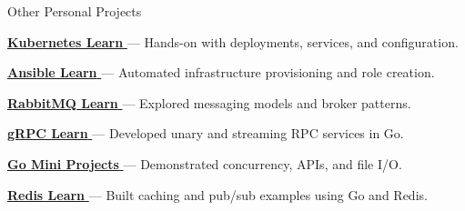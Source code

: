 \begin{cventries}
  \cventry
    {}
    {Other Personal Projects}
    {}
    {}
    {
      \begin{cvitems}
        \item {\href{https://github.com/nmdra/K8s-Learn}{\textbf{Kubernetes Learn} \faGithub} — Hands-on with deployments, services, and configuration.}
        \item {\href{https://github.com/nmdra/Ansible-Learn}{\textbf{Ansible Learn} \faGithub} — Automated infrastructure provisioning and role creation.}
        \item {\href{https://github.com/nmdra/RabbitMQ-Learn}{\textbf{RabbitMQ Learn} \faGithub} — Explored messaging models and broker patterns.}
        \item {\href{https://github.com/nmdra/gRPC-Learn}{\textbf{gRPC Learn} \faGithub} — Developed unary and streaming RPC services in Go.}
        \item {\href{https://github.com/nmdra/Go-Mini-Projects}{\textbf{Go Mini Projects} \faGithub} — Demonstrated concurrency, APIs, and file I/O.}
        \item {\href{https://github.com/nmdra/Redis-Learn}{\textbf{Redis Learn} \faGithub} — Built caching and pub/sub examples using Go and Redis.}
      \end{cvitems}
    }

\end{cventries}
